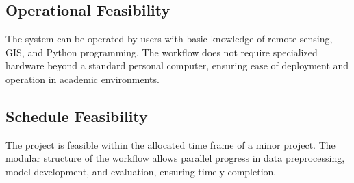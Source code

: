 \documentclass[main]{subfiles}
\begin{document}
\subsection{Operational Feasibility}
The system can be operated by users with basic knowledge of remote sensing, GIS, and Python programming. The workflow does not require specialized hardware beyond a standard personal computer, ensuring ease of deployment and operation in academic environments.

\subsection{Schedule Feasibility}
The project is feasible within the allocated time frame of a minor project. The modular structure of the workflow allows parallel progress in data preprocessing, model development, and evaluation, ensuring timely completion.
\end{document}
